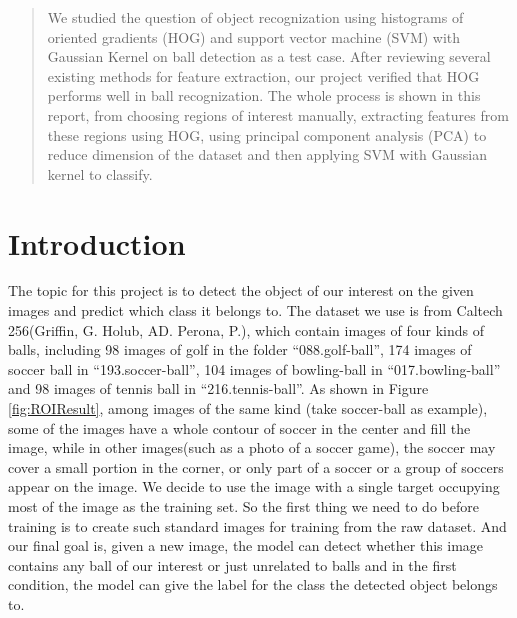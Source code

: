 \documentclass{article}
\begin{document}
 


\begin{abstract} 
We studied the question of object recognization using histograms of oriented gradients (HOG) and support vector machine (SVM) with Gaussian Kernel on ball detection as a test case. After reviewing several existing methods for feature extraction, our project verified that HOG performs well in ball recognization. The whole process is shown in this report, from choosing regions of interest manually, extracting features from these regions using HOG, using principal component analysis (PCA) to reduce dimension of the  dataset and then applying SVM with Gaussian kernel to classify.   
\end{abstract}


\section{Introduction}
The topic for this project is to detect the object of our interest on the given images and predict which class it belongs to. The dataset we use is from Caltech 256(Griffin, G. Holub, AD. Perona, P.), which contain images of four kinds of balls, including 98 images of golf in the folder ``088.golf-ball'', 174 images of soccer ball in ``193.soccer-ball'', 104 images of bowling-ball in ``017.bowling-ball'' and 98 images of tennis ball in ``216.tennis-ball''. As shown in Figure \ref{fig:ROIResult}, among images of the same kind (take soccer-ball as example), some of the images have a whole contour of soccer in the center and fill the image, while in other images(such as a photo of a soccer game), the soccer may cover a small portion in the corner, or only part of a soccer or a group of soccers appear on the image. We decide to use the image with a single target occupying most of the image as the training set. So the first thing we need to do before training is to create such standard images for training from the raw dataset. And our final goal is, given a new image,  the model can detect whether this image contains any ball of our interest or just unrelated to balls and in the first condition, the model can give the label for the class the detected object belongs to.
\end{document}
